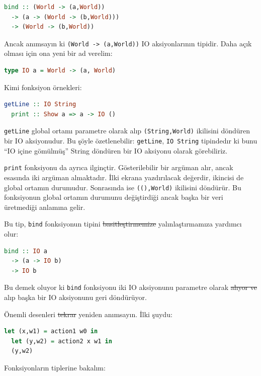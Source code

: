 \documentclass[a4paper,14pt,openany]{extbook} %
\begin{document}
\begin{lstlisting}[language=Haskell]
  bind :: (World -> (a,World))
  -> (a -> (World -> (b,World)))
  -> (World -> (b,World))
\end{lstlisting}

Ancak anımsayın ki \lstinline!(World -> (a,World))! IO aksiyonlarının
tipidir. Daha açık olması için ona yeni bir ad verelim:

\begin{lstlisting}[language=Haskell]
  type IO a = World -> (a, World)
\end{lstlisting}

Kimi fonksiyon örnekleri:

\begin{lstlisting}[language=Haskell]
  getLine :: IO String
  print :: Show a => a -> IO ()
\end{lstlisting}

\lstinline!getLine! global ortamı parametre olarak alıp 
\lstinline!(String,World)! ikilisini döndüren bir IO aksiyonudur.
Bu şöyle özetlenebilir: \lstinline!getLine!, \lstinline!IO String!
tipindedır ki bunu ``IO içine gömülmüş'' String döndüren bir IO
aksiyonu olarak görebiliriz.

\lstinline!print! fonksiyonu da ayrıca ilginçtir. Gösterilebilir bir
argüman alır, ancak esasında iki argüman almaktadır. İlki ekrana
yazdırılacak değerdir, ikincisi de global ortamın durumudur. Sonrasında ise
\lstinline!((),World)! ikilisini döndürür. Bu fonksiyonun global ortamın
durumunu değiştirdiği ancak başka bir veri üretmediği anlamına gelir.

Bu tip, \lstinline!bind! fonksiyonun tipini \st{basitleştirmemize} yalınlaştırmamıza  yardımcı
olur:

\begin{lstlisting}[language=Haskell]
  bind :: IO a
  -> (a -> IO b)
  -> IO b
\end{lstlisting}

Bu demek oluyor ki \lstinline!bind! fonksiyonu iki IO aksiyonunu
parametre olarak \st{alıyor ve} alıp başka bir IO aksiyonunu geri döndürüyor.

Önemli desenleri \st{tekrar} yeniden anımsayın. İlki şuydu:

\begin{lstlisting}[language=Haskell]
  let (x,w1) = action1 w0 in
  let (y,w2) = action2 x w1 in
  (y,w2)
\end{lstlisting}

Fonksiyonların tiplerine bakalım:
\end{document}
